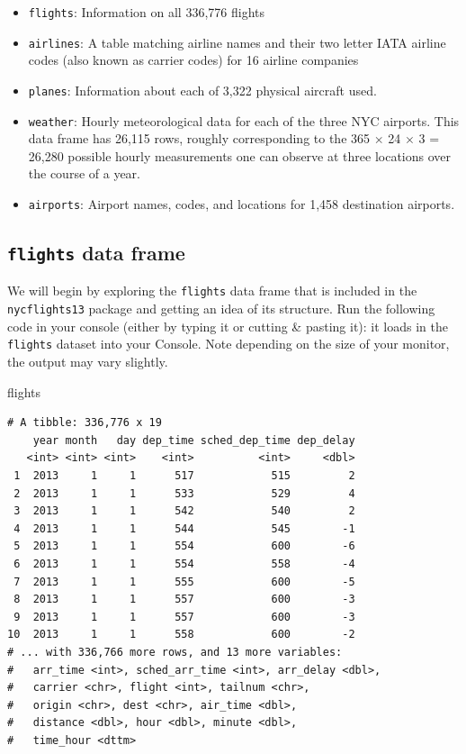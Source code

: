 \documentclass[12pt, krantz2,]{krantz}
\makeatletter
\newenvironment{Shaded}{\begin{snugshade}}{\end{snugshade}}
\newcommand{\NormalTok}[1]{#1}
\providecommand{\tightlist}{%
  \setlength{\itemsep}{0pt}\setlength{\parskip}{0pt}}
\newenvironment{kframe}{%
\medskip{}
\setlength{\fboxsep}{.8em}
 \def\at@end@of@kframe{}%
 \ifinner\ifhmode%
  \def\at@end@of@kframe{\end{minipage}}%
  \begin{minipage}{\columnwidth}%
 \fi\fi%
 \def\FrameCommand##1{\hskip\@totalleftmargin \hskip-\fboxsep
 \colorbox{shadecolor}{##1}\hskip-\fboxsep
     \hskip-\linewidth \hskip-\@totalleftmargin \hskip\columnwidth}%
 \MakeFramed {\advance\hsize-\width
   \@totalleftmargin\z@ \linewidth\hsize
   \@setminipage}}%
 {\par\unskip\endMakeFramed%
 \at@end@of@kframe}
\renewenvironment{Shaded}{\begin{kframe}}{\end{kframe}}
\makeatother
\begin{document}
\begin{itemize}
\tightlist
\item
  \texttt{flights}: Information on all 336,776 flights
\item
  \texttt{airlines}: A table matching airline names and their two letter IATA airline codes (also known as carrier codes) for 16 airline companies
\item
  \texttt{planes}: Information about each of 3,322 physical aircraft used.
\item
  \texttt{weather}: Hourly meteorological data for each of the three NYC airports. This data frame has 26,115 rows, roughly corresponding to the 365 \(\times\) 24 \(\times\) 3 = 26,280 possible hourly measurements one can observe at three locations over the course of a year.
\item
  \texttt{airports}: Airport names, codes, and locations for 1,458 destination airports.
\end{itemize}

\hypertarget{flights-data-frame}{%
\subsection{\texorpdfstring{\texttt{flights} data frame}{flights data frame}}\label{flights-data-frame}}

We will begin by exploring the \texttt{flights} data frame that is included in the \texttt{nycflights13} package and getting an idea of its structure. Run the following code in your console (either by typing it or cutting \& pasting it): it loads in the \texttt{flights} dataset into your Console. Note depending on the size of your monitor, the output may vary slightly.

\begin{Shaded}
\begin{Highlighting}[]
\NormalTok{flights}
\end{Highlighting}
\end{Shaded}

\begin{verbatim}
# A tibble: 336,776 x 19
    year month   day dep_time sched_dep_time dep_delay
   <int> <int> <int>    <int>          <int>     <dbl>
 1  2013     1     1      517            515         2
 2  2013     1     1      533            529         4
 3  2013     1     1      542            540         2
 4  2013     1     1      544            545        -1
 5  2013     1     1      554            600        -6
 6  2013     1     1      554            558        -4
 7  2013     1     1      555            600        -5
 8  2013     1     1      557            600        -3
 9  2013     1     1      557            600        -3
10  2013     1     1      558            600        -2
# ... with 336,766 more rows, and 13 more variables:
#   arr_time <int>, sched_arr_time <int>, arr_delay <dbl>,
#   carrier <chr>, flight <int>, tailnum <chr>,
#   origin <chr>, dest <chr>, air_time <dbl>,
#   distance <dbl>, hour <dbl>, minute <dbl>,
#   time_hour <dttm>
\end{verbatim}
\end{document}
